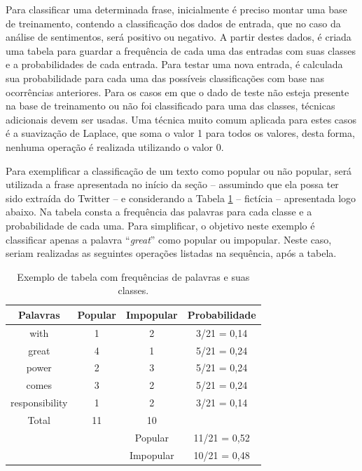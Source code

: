 \documentclass[oneside,openright,12pt]{ufsm_2015} %
\begin{document}
    \par Para classificar uma determinada frase, inicialmente é preciso montar uma base de treinamento, contendo a classificação dos dados de entrada, que no caso da análise de sentimentos, será positivo ou negativo. A partir destes dados, é criada uma tabela para guardar a frequência de cada uma das entradas com suas classes e a probabilidades de cada entrada. Para testar uma nova entrada, é calculada sua probabilidade para cada uma das possíveis classificações com base nas ocorrências anteriores. Para os casos em que o dado de teste não esteja presente na base de treinamento ou não foi classificado para uma das classes, técnicas adicionais devem ser usadas. Uma técnica muito comum aplicada para estes casos é a suavização de Laplace, que soma o valor 1 para todos os valores, desta forma, nenhuma operação é realizada utilizando o valor 0.
    
    \par Para exemplificar a classificação de um texto como popular ou não popular, será utilizada a frase apresentada no início da seção -- assumindo que ela possa ter sido extraída do Twitter -- e considerando a Tabela \ref{tab:naive-freq}  -- fictícia -- apresentada logo abaixo. Na tabela consta a frequência das palavras para cada classe e a probabilidade de cada uma. Para simplificar, o objetivo neste exemplo é classificar apenas a palavra ``\textit{great}'' como popular ou impopular. Neste caso, seriam realizadas as seguintes operações listadas na sequência, após a tabela.
    
    \begin{table}[ht]
        \caption{Exemplo de tabela com frequências de palavras e suas classes.}
        \centering
        \begin{tabular}{ c c c c }
            \hline
            Palavras & Popular & Impopular & Probabilidade \\
            \hline
            with & 1 & 2 & 3/21 = 0,14 \\
            great & 4 & 1 & 5/21 = 0,24 \\
            power & 2 & 3 & 5/21 = 0,24 \\
            comes & 3 & 2 & 5/21 = 0,24 \\
            responsibility & 1 & 2 & 3/21 = 0,14 \\
            \hline
            Total & 11 & 10 & \\
            \hline
            & & Popular & 11/21 = 0,52 \\
            & & Impopular & 10/21 = 0,48 \\
            \hline
        \end{tabular}
        \vspace{\baselineskip} %
        \label{tab:naive-freq}
    \end{table}
    
\end{document}
